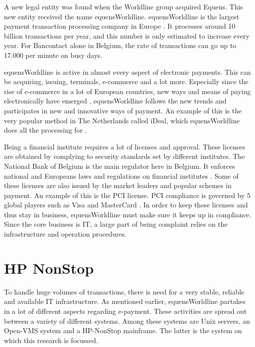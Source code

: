 A new legal entity was found when the Worldline group acquired Equens. This new entity 
received the name equensWorldline. equensWorldline is the largest payment transaction processing company in Europe \autocite{AtosWorldline}. It processes around
10 billion transactions  per year, and this number is only estimated to increase every year. For Bancontact alone in Belgium,
the rate of transactions can go up to 17.000 per minute on busy days\autocite{hlnrec}. 

equensWorldline is active in almost every aspect of electronic payments. This can be
acquiring, issuing, terminals, e-commerce and a lot more. Especially since the rise of e-commerce in a lot of European
countries, new ways and means of paying electronically have emerged \autocite{ecom}. equensWorldline follows the new trends and  participates in new and innovative ways
of payment. An example of this is the very popular method in The Netherlands called iDeal,
which equensWorldline does all the processing for \autocite{intern}. 

Being a financial institute requires a lot of licenses and approval. These licenses are obtained by complying to security standards set by different institutes.
The National Bank of Belgium is the main regulator here in Belgium. It enforces national and Europeans laws and regulations
on financial institutes \autocite{NBB}. Some of these licenses are also issued by the market leaders and popular schemes in payment. An example of this is the PCI license.
PCI compliance is governed by 5 global players such as Visa and MasterCard \autocite{PCI}. In order to keep these licenses
and thus stay in business, equensWorldline must make sure it keeps up in compliance. Since the core business is IT, a large
part of being complaint relies on the infrastructure and operation procedures. 

\section{HP NonStop}

To handle huge volumes of transactions, there is need for a very stable, reliable and available 
IT infrastructure. As mentioned earlier, equensWorldline partakes in a lot of different aspects regarding
e-payment. These activities are spread out between a variety of different 
systems. Among these systems are Unix servers, an Open-VMS system and a HP-NonStop mainframe. The latter
is the system on which this research is focussed.

